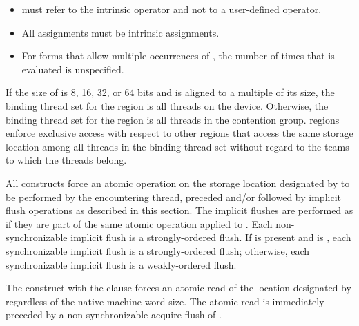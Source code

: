 \begin{itemize}
\item {} must refer to the intrinsic operator and not to a user-defined operator.

\item All assignments must be intrinsic assignments.

\item For forms that allow multiple occurrences of , the number of times that  is 
evaluated is unspecified.
\fortranspecificend %

\end{itemize}

\begin{samepage}

\binding
If the size of  is 8, 16, 32, or 64 bits and  is aligned to a
multiple of its size, the binding thread set for the  region is 
all threads on the device. Otherwise, the binding thread set for the 
 region is all threads in the contention group.   
regions enforce exclusive access with respect to other  regions 
that access the same storage location  among all threads in the 
binding thread set without regard to the teams to which the threads belong. 

\descr

All  constructs force an atomic operation on the storage location
designated by  to be performed by the encountering thread, preceded
and/or followed by implicit flush operations as described in this section. The
implicit flushes are performed as if they are part of the same atomic
operation applied to .  Each non-synchronizable implicit flush is a
strongly-ordered flush. If  is present and is ,
each synchronizable implicit flush is a strongly-ordered flush; otherwise,
each synchronizable implicit flush is a weakly-ordered flush.

The  construct with the  clause forces an atomic read of the location 
designated by  regardless of the native machine word size. The atomic
read is immediately preceded by a non-synchronizable acquire flush of .
\end{samepage}

